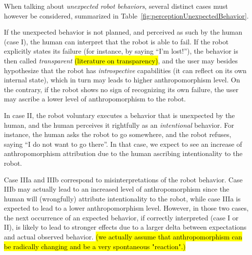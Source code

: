 \documentclass{frontiersSCNS} %
\begin{document}
When talking about \emph{unexpected robot behaviors}, several distinct cases
must however be considered, summarized in
Table~\ref{fig:perceptionUnexpectedBehavior}.

If the unexpected behavior is not planned, and perceived as such by the human
(case I), the human can interpret that the robot is able to fail. If the robot
explicitly states its failure (for instance, by saying ``I'm lost!''), the
behavior is then called \emph{transparent} 
\hl{(literature on transparency)}, and the user may besides hypothesize that the
robot has \emph{introspective} capabilities (it can reflect on its own internal
state), which in turn may leads to higher anthropomorphism level.  On the
contrary, if the robot shows no sign of recognizing its own failure, the user
may ascribe a lower level of anthropomorphism to the robot.

In case II, the robot voluntary executes a behavior that is unexpected by the
human, and the human perceives it rightfully as an \emph{intentional} behavior.
For instance, the human asks the robot to go somewhere, and the robot refuses,
saying ``I do not want to go there''. In that case, we expect to see an increase
of anthropomorphism attribution due to the human ascribing intentionality to the
robot.

Case IIIa and IIIb correspond to misinterpretations of the robot behavior. Case
IIIb may actually lead to an increased level of anthropomorphism since the human
will (wrongfully) attribute intentionality to the robot, while case IIIa is
expected to lead to a lower anthropomorphism level.  However, in those two
cases, the next occurrence of an expected behavior, if correctly interpreted
(case I or II), is likely to lead to stronger effects due to a larger delta
between expectations and actual observed behavior. \hl{(we actually assume that
anthropomorphism can be radically changing and be a very spontaneous
"reaction".)}



%
%
%
%
%
%


\vspace{2cm}
\end{document}
